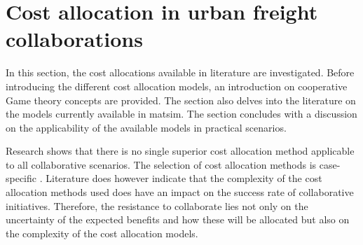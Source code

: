 
\section{Cost allocation in urban freight collaborations}

In this section, the cost allocations available in literature are investigated. Before introducing the different cost allocation models, an introduction on cooperative Game theory concepts are provided. The section also delves into the literature on the models currently available in \acrshort{matsim}. The section concludes with a discussion on the applicability of the available models in practical scenarios.\par


Research shows that there is no single superior cost allocation method applicable to all collaborative scenarios. The selection of cost allocation methods is case-specific \citep{ouhader2017combining}. Literature does however indicate that the complexity of the cost allocation methods used does have an impact on the success rate of collaborative initiatives. Therefore, the resistance to collaborate lies not only on the uncertainty of the expected benefits and how these will be allocated but also on the complexity of the cost allocation models.\par


